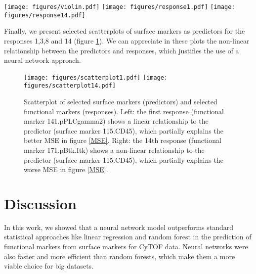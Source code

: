 \documentclass[conference]{IEEEtran}
\begin{document}
\begin{figure*}
\centering
\texttt{[image: figures/violin.pdf]} \hspace{0.25cm}
\texttt{[image: figures/response1.pdf]}
\hspace{0.25cm}
\texttt{[image: figures/response14.pdf]}
\caption{Left: Violin plot for four functional markers (responses). Horizontal lines represent the 25th quantile, median and 75th quantile. Center: Predicted vs observed responses on the first functional marker (141.pPLCgamma2)
  across all four methods. Left: Predicted vs observed responses on the 14th functional marker (171.pBtk.Itk)
  across all four methods. The closer the slope to 1 (black line), the
  better.}
\label{violin}
\end{figure*}

Finally, we present selected scatterplots of surface markers as predictors for the responses 1,3,8 and 14 (figure
\ref{predObs}). We can appreciate in these plots the non-linear relationship between the predictors and responses, which justifies the use of a neural network approach.

\begin{figure}[ht]
\centering
\texttt{[image: figures/scatterplot1.pdf]} \hspace{0.5cm}
\texttt{[image: figures/scatterplot14.pdf]}
\caption{Scatterplot of selected surface markers (predictors) and selected functional markers (responses). Left: the first response (functional marker 141.pPLCgamma2) shows a linear relationship to the predictor (surface marker 115.CD45), which partially explains the better MSE in figure \ref{MSE}. Right: the 14th response (functional marker 171.pBtk.Itk) shows a non-linear relationship to the predictor (surface marker 115.CD45), which partially explains the worse MSE in figure \ref{MSE}.}
\label{predObs}
\end{figure}



\section{Discussion}

In this work, we showed that a neural network model outperforms
standard statistical approaches like linear regression and random
forest in the prediction of functional markers from surface markers
for CyTOF data. Neural networks were also faster and more efficient
than random forests, which make them a more viable choice for big
datasets.
\end{document}
